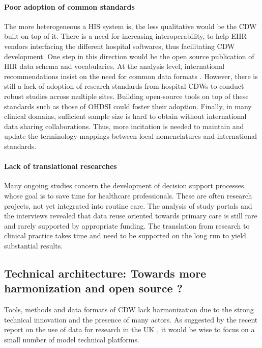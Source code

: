 \documentclass[french,12pt,twoside,a4paper]{book}
\begin{document}
\paragraph{Poor adoption of common standards} The more heterogeneous a HIS system is, the less qualitative would be the CDW
built on top of it. There is a need for increasing interoperability, to help EHR
vendors interfacing the different hospital softwares, thus facilitating CDW
development. One step in this direction would be the open source publication of
HIR data schema and vocabularies. At the analysis level, international recommendations insist
on the need for common data formats \citep{zhang_best_2022,kohane_what_2021}.
However, there is still a lack of adoption of research standards from hospital
CDWs to conduct robust studies across multiple sites. Building open-source tools
on top of these standards such as those of OHDSI \citep{schuemie_book_2021} could
foster their adoption. Finally, in many clinical domains, sufficient sample size
is hard to obtain without international data sharing collaborations. Thus, more
incitation is needed to maintain and update the terminology mappings between
local nomenclatures and international standards.

\paragraph{Lack of translational researches} Many ongoing studies concern the development of decision support processes whose
goal is to save time for healthcare professionals. These are often research
projects, not yet integrated into routine care. The analysis of study portals
and the interviews revealed that data reuse oriented towards primary care is
still rare and rarely supported by appropriate funding. The translation from
research to clinical practice takes time and need to be supported on the long
run to yield substantial results.

\subsection{Technical architecture: Towards more harmonization and open source
  ?}%
\label{subsec:cdw:recommendations:architecture} %

Tools, methods and data formats of CDW lack harmonization due to the strong
technical innovation and the presence of many actors. As suggested by the recent
report on the use of data for research in the UK \citep{goldacre_better_2022}, it
would be wise to focus on a small number of model technical platforms.
\end{document}
